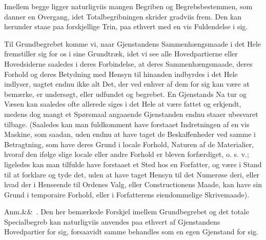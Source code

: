 \documentclass[12pt]{book}
\def\sperr#1{#1}%
\def\textit#1{#1}%
\def\emph#1{#1}%
\newcommand{\sperr}[1]{\textls[180]{#1}}
\newcommand{\anm}[1]{%
  \par\vspace{0.5\baselineskip}%
  \noindent\hspace{\parindent}\sperr{Anm.}\ifx&#1&\else~\textit{#1}.\fi
  \enspace\ignorespaces
}
\newcommand{\opage}[1]{\marginnote{\footnotesize\textit{[#1]}}}
\begin{document}
Imellem begge ligger naturligviis mangen Begriben og Begrebsbestemmen, som
danner en Overgang, idet Totalbegribningen skrider gradviis frem. Den kan
herunder staae paa forskjellige Trin, paa ethvert med en vis Fuldendelse i sig.

Til \emph{Grundbegrebet} komme vi, naar Gjenstandens Sammenhængsmaade i det Hele
fremstiller sig for os i sine Grundtræk, idet vi see alle Hovedpartierne eller
Hovedsiderne saaledes i deres Forbindelse, at deres Sammenhængsmaade, deres
Forhold og deres Betydning med Hensyn til hinanden indbyrdes i det Hele
indlyser, uagtet endnu ikke alt Det, der ved enhver af dem for sig kan være at
bemærke, er undersøgt, eller udfundet og begrebet. En Gjenstands Na%
\opage{116}tur og Væsen kan saaledes ofte allerede siges i det Hele at være fattet og
erkjendt, medens dog mangt et Spørsmaal angaaende Gjenstanden endnu staaer
ubesvaret tilbage. (Saaledes kan man fuldkomment have forstaaet Indretningen af
en vis Maskine, som saadan, uden endnu at have taget de Beskaffenheder ved samme
i Betragtning, som have deres Grund i locale Forhold, Naturen af de Materialier,
hvoraf den ifølge slige locale eller andre Forhold er bleven forfærdiget,
o. s. v.; ligeledes kan man tilfulde have forstaaet et Sted hos en Forfatter, og
være i Stand til at forklare og tyde det, uden at have taget Hensyn til det
Numerøse deri, eller hvad der i Henseende til Ordenes Valg, eller Constructionens
Maade, kan have sin Grund i temporaire Forhold, eller i Forfatterens
eiendommelige Skrivemaade).

\anm{} Den her bemærkede Forskjel imellem Grundbegrebet og det totale
Specialbegreb kan naturligviis anvendes paa ethvert af Gjenstandens
Hovedpartier for sig, forsaavidt samme behandles som en egen Gjenstand for sig.
\end{document}
